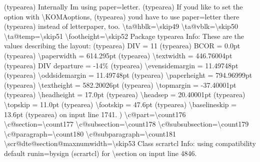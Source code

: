 \documentclass[
  letterpaper,
  DIV=11,
  numbers=noendperiod]{scrartcl}
\newenvironment{Shaded}{\begin{snugshade}}{\end{snugshade}}
\newcommand{\NormalTok}[1]{\textcolor[rgb]{0.00,0.23,0.31}{#1}}
\begin{document}
\begin{Shaded}
\begin{Highlighting}[]
\NormalTok{(typearea)             Internally I\textquotesingle{}m using \textasciigrave{}paper=letter\textquotesingle{}.}
\NormalTok{(typearea)             If you\textquotesingle{}d like to set the option with \textbackslash{}KOMAoptions,}
\NormalTok{(typearea)             you\textquotesingle{}d have to use \textasciigrave{}paper=letter\textquotesingle{} there}
\NormalTok{(typearea)             instead of \textasciigrave{}letterpaper\textquotesingle{}, too.}
\NormalTok{\textbackslash{}ta@hblk=\textbackslash{}skip49}
\NormalTok{\textbackslash{}ta@vblk=\textbackslash{}skip50}
\NormalTok{\textbackslash{}ta@temp=\textbackslash{}skip51}
\NormalTok{\textbackslash{}footheight=\textbackslash{}skip52}
\NormalTok{Package typearea Info: These are the values describing the layout:}
\NormalTok{(typearea)             DIV  = 11}
\NormalTok{(typearea)             BCOR = 0.0pt}
\NormalTok{(typearea)             \textbackslash{}paperwidth      = 614.295pt}
\NormalTok{(typearea)              \textbackslash{}textwidth      = 446.76004pt}
\NormalTok{(typearea)              DIV departure   = {-}14\%}
\NormalTok{(typearea)              \textbackslash{}evensidemargin = 11.49748pt}
\NormalTok{(typearea)              \textbackslash{}oddsidemargin  = 11.49748pt}
\NormalTok{(typearea)             \textbackslash{}paperheight     = 794.96999pt}
\NormalTok{(typearea)              \textbackslash{}textheight     = 582.20026pt}
\NormalTok{(typearea)              \textbackslash{}topmargin      = {-}37.40001pt}
\NormalTok{(typearea)              \textbackslash{}headheight     = 17.0pt}
\NormalTok{(typearea)              \textbackslash{}headsep        = 20.40001pt}
\NormalTok{(typearea)              \textbackslash{}topskip        = 11.0pt}
\NormalTok{(typearea)              \textbackslash{}footskip       = 47.6pt}
\NormalTok{(typearea)              \textbackslash{}baselineskip   = 13.6pt}
\NormalTok{(typearea)              on input line 1741.}
\NormalTok{)}
\NormalTok{\textbackslash{}c@part=\textbackslash{}count176}
\NormalTok{\textbackslash{}c@section=\textbackslash{}count177}
\NormalTok{\textbackslash{}c@subsection=\textbackslash{}count178}
\NormalTok{\textbackslash{}c@subsubsection=\textbackslash{}count179}
\NormalTok{\textbackslash{}c@paragraph=\textbackslash{}count180}
\NormalTok{\textbackslash{}c@subparagraph=\textbackslash{}count181}
\NormalTok{\textbackslash{}scr@dte@section@maxnumwidth=\textbackslash{}skip53}
\NormalTok{Class scrartcl Info: using compatibility default \textasciigrave{}runin=bysign\textquotesingle{}}
\NormalTok{(scrartcl)           for \textasciigrave{}\textbackslash{}section on input line 4846.}

\end{Highlighting}
\end{Shaded}
\end{document}
